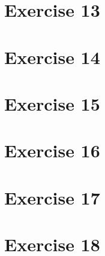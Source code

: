 \documentclass[10pt,twoside,a4paper]{article}
\begin{document}
\section*{Exercise 13}
\section*{Exercise 14}
\section*{Exercise 15}
\section*{Exercise 16}
\section*{Exercise 17}
\section*{Exercise 18}
\end{document}
